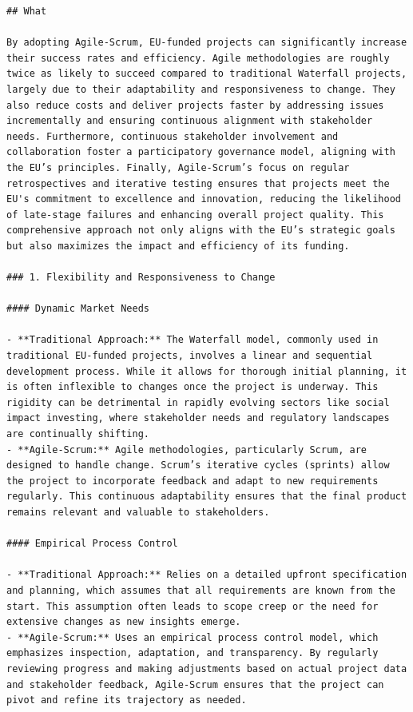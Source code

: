 \documentclass[
  letterpaper,
  DIV=11,
  numbers=noendperiod]{scrreprt}
\begin{document}
\begin{verbatim}
## What

By adopting Agile-Scrum, EU-funded projects can significantly increase their success rates and efficiency. Agile methodologies are roughly twice as likely to succeed compared to traditional Waterfall projects, largely due to their adaptability and responsiveness to change. They also reduce costs and deliver projects faster by addressing issues incrementally and ensuring continuous alignment with stakeholder needs. Furthermore, continuous stakeholder involvement and collaboration foster a participatory governance model, aligning with the EU’s principles. Finally, Agile-Scrum’s focus on regular retrospectives and iterative testing ensures that projects meet the EU's commitment to excellence and innovation, reducing the likelihood of late-stage failures and enhancing overall project quality. This comprehensive approach not only aligns with the EU’s strategic goals but also maximizes the impact and efficiency of its funding.

### 1. Flexibility and Responsiveness to Change

#### Dynamic Market Needs

- **Traditional Approach:** The Waterfall model, commonly used in traditional EU-funded projects, involves a linear and sequential development process. While it allows for thorough initial planning, it is often inflexible to changes once the project is underway. This rigidity can be detrimental in rapidly evolving sectors like social impact investing, where stakeholder needs and regulatory landscapes are continually shifting.
- **Agile-Scrum:** Agile methodologies, particularly Scrum, are designed to handle change. Scrum’s iterative cycles (sprints) allow the project to incorporate feedback and adapt to new requirements regularly. This continuous adaptability ensures that the final product remains relevant and valuable to stakeholders.

#### Empirical Process Control

- **Traditional Approach:** Relies on a detailed upfront specification and planning, which assumes that all requirements are known from the start. This assumption often leads to scope creep or the need for extensive changes as new insights emerge.
- **Agile-Scrum:** Uses an empirical process control model, which emphasizes inspection, adaptation, and transparency. By regularly reviewing progress and making adjustments based on actual project data and stakeholder feedback, Agile-Scrum ensures that the project can pivot and refine its trajectory as needed.


\end{verbatim}
\end{document}
